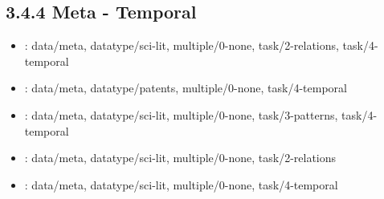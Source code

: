 \begin {refsection}
\section [3.4.4 Meta - Temporal] {3.4.4 Meta - Temporal}

\begin {itemize}
\item \cite {hascoet-2012-interactive-graph-matching-and-visual-comparison}:
    data/meta, datatype/sci-lit, multiple/0-none, task/2-relations, task/4-temporal


\item \cite {chen-2011-visualization-of-the-technology-evolution-in-smart-grid}:
    data/meta, datatype/patents, multiple/0-none, task/4-temporal


\item \cite {shneiderman-2000-visualizing-digital-library-search-results}:
    data/meta, datatype/sci-lit, multiple/0-none, task/3-patterns, task/4-temporal


\item \cite {alsallakh-2013-radial-sets:-interactive-visual-analysis}:
    data/meta, datatype/sci-lit, multiple/0-none, task/2-relations


\item \cite {collins-2009-bubble-sets:-revealing-set-relations-with}:
    data/meta, datatype/sci-lit, multiple/0-none, task/4-temporal


\end {itemize}
\printbibliography
\end {refsection}\pagebreak

